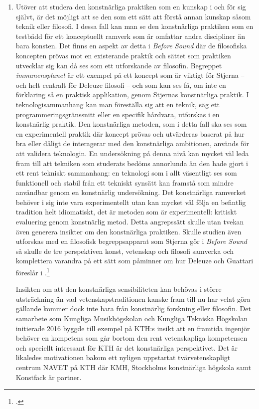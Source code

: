 \documentclass[11pt]{article}
\begin{document}
\begin{enumerate}
  \item Utöver att studera den konstnärliga praktiken som en kunskap i
    och för sig självt, är det möjligt att se den som ett sätt att
    förstå annan kunskap såsom teknik eller filosofi. I dessa fall kan
    man se den konstnärliga praktiken som en testbädd för ett
    konceptuellt ramverk som är omfattar andra discipliner än bara
    konsten. Det finns en aspekt av detta i \emph{Before Sound} där de
    filosofiska koncepten prövas mot en existerande praktik och sättet
    som praktiken utvecklar sig kan då ses som ett utforskande av
    filosofin. Begreppet \emph{immanensplanet} är ett exempel på ett
    koncept som är viktigt för Stjerna -- och helt centralt för
    Deleuze filosofi -- och som kan ses få, om inte en förklaring så
    en praktisk applikation, genom Stjernas konstnärliga praktik. I
    teknologisammanhang kan man föreställa sig att en teknik, säg ett
    programmeringsgränssnitt eller en specifik hårdvara, utforskas i
    en konstnärlig praktik. Den konstnärliga metoden, som i detta fall
    ska ses som en experimentell praktik där koncept prövas och
    utvärderas baserat på hur bra eller dåligt de interagerar med den
    konstnärliga ambitionen, används för att validera teknologin. En
    undersökning på denna nivå kan mycket väl leda fram till att
    tekniken som studerats bedöms annorlunda än den hade gjort i ett
    rent tekniskt sammanhang: en teknologi som i allt väsentligt ses
    som funktionell och stabil från ett tekniskt synsätt kan framstå
    som mindre användbar genom en konstnärlig undersökning. Det
    konstnärliga ramverket behöver i sig inte vara experimentellt utan
    kan mycket väl följa en befintlig tradition helt idiomatiskt, det
    är metoden som är experimentell: kritiskt evaluering genom
    konstnärlig metod. Detta angrepssätt skulle utan tvekan även
    generera insikter om den konstnärliga praktiken. Skulle studien
    även utforskas med en filosofisk begreppsapparat som Stjerna gör i
    \emph{Before Sound} så skulle de tre perspektiven konst, vetenskap
    och filosofi samverka och komplettera varandra på ett sätt som
    påminner om hur Deleuze och Guattari föreslår i
    .\footcite{deleuze1994}

    Insikten om att den konstnärliga sensibiliteten kan behövas i
    större utsträckning än vad vetenskapstraditionen kanske fram till
    nu har velat göra gällande kommer dock inte bara från konstnärlig
    forskning eller filosofin. Det samarbete som Kungliga
    Musikhögskolan och Kungliga Tekniska Högskolan initierade 2016
    byggde till exempel på KTH:s insikt att en framtida ingenjör
    behöver en kompetens som går bortom den rent vetenskapliga
    kompetensen och speciellt intressant för KTH är det konstnärliga
    perspektivet. Det är likaledes motivationen bakom ett nyligen
    uppstartat tvärvetenskapligt centrum NAVET på KTH där KMH,
    Stockholms konstnärliga högskola samt Konstfack är partner.


\end{enumerate}
\end{document}
